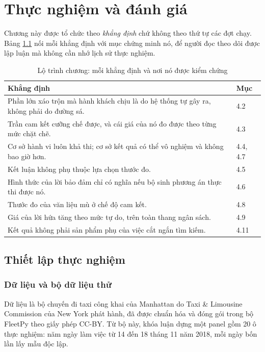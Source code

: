 \chapter{Thực nghiệm và đánh giá}

Chương này được tổ chức theo \emph{khẳng định} chứ không theo thứ tự các đợt chạy. Bảng
\ref{bang:lotrinh} nối mỗi khẳng định với mục chứng minh nó, để người đọc theo dõi được lập
luận mà không cần nhớ lịch sử thực nghiệm.

\begin{table}[htbp]
\centering
\caption{Lộ trình chương: mỗi khẳng định và nơi nó được kiểm chứng}
\label{bang:lotrinh}
\small
\begin{tabular}{@{}p{9.6cm}l@{}}
\toprule
\textbf{Khẳng định} & \textbf{Mục}\\
\midrule
Phần lớn xáo trộn mà hành khách chịu là do hệ thống tự gây ra, không phải do đường sá. & 4.2\\
Trần cam kết cưỡng chế được, và cái giá của nó đo được theo từng mức chặt chẽ. & 4.3\\
Cơ sở hành vi luôn khả thi; cơ sở kết quả có thể vô nghiệm và không bao giờ hơn. & 4.4, 4.7\\
Kết luận không phụ thuộc lựa chọn thước đo. & 4.5\\
Hình thức của lời bảo đảm chỉ có nghĩa nếu bộ sinh phương án thực thi được nó. & 4.6\\
Thước đo của văn liệu mù ở chế độ cam kết. & 4.8\\
Giá của lời hứa tăng theo mức tự do, trên toàn thang ngân sách. & 4.9\\
Kết quả không phải sản phẩm phụ của việc cắt ngắn tìm kiếm. & 4.11\\
\bottomrule
\end{tabular}
\end{table}

\section{Thiết lập thực nghiệm}
\label{muc:thietlap}

\subsection{Dữ liệu và bộ dữ liệu thử}

Dữ liệu là bộ chuyến đi taxi công khai của Manhattan do Taxi \& Limousine Commission của New
York phát hành, đã được chuẩn hóa và đóng gói trong bộ FleetPy \cite{fleetpy2022} theo giấy
phép CC-BY. Từ bộ này, khóa luận dựng một panel gồm 20 ô thực nghiệm: năm ngày làm việc từ 14
đến 18 tháng 11 năm 2018, mỗi ngày bốn lần lấy mẫu độc lập.

